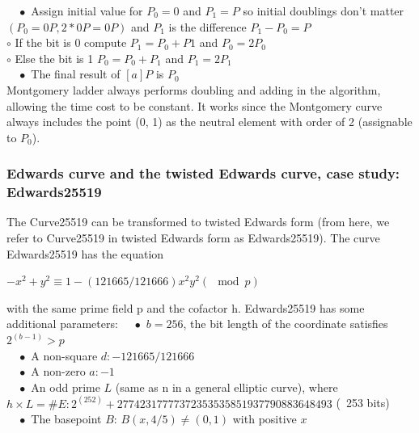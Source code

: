 $\quad\bullet$ Assign initial value for $P_0 = 0$ and $P_1 = P$ so initial doublings don’t matter $(P_0 =0P, 2*0P = 0P)$ and $P_1$ is the difference $P_1 - P_0 = P$\\
\vspace{0.5cm} $\circ$ If the bit is 0 compute $P_1 = P_0 +  P1$ and $P_0 = 2P_0$\\
\vspace{0.5cm} $\circ$ Else the bit is 1 $P_0 = P_0 +  P_1$ and $P_1 = 2P_1$\\

$\quad\bullet$ The final result of $[a]P$ is $P_0$\\

Montgomery ladder always performs doubling and adding in the algorithm, allowing the time cost to be constant. It works since the Montgomery curve always includes the point (0, 1) as the neutral element with order of 2 (assignable to $P_0$).\\


\subsubsection{Edwards curve and the twisted Edwards curve, case study: Edwards25519}
The Curve25519 can be transformed to twisted Edwards form (from here, we refer to Curve25519 in twisted Edwards form as Edwards25519). The curve Edwards25519 has the equation
\hspace{0.5cm}
\begin{center}
$- x^2 + y^2 \equiv 1 - (121665/121666)x^2 y^2(\mod p) $\\
\end{center}
\hspace{0.5cm}
with the same prime field p and the cofactor h. Edwards25519 has some additional parameters:
$\quad\bullet$ $b = 256$, the bit length of the coordinate satisfies $2^(b-1) > p$\\
$\quad\bullet$ A non-square $d: -121665/121666$\\
$\quad\bullet$ A non-zero $a: -1$\\
$\quad\bullet$ An odd prime $L$ (same as n in a general elliptic curve), where $h \times L = \#E: 2^(252)+27742317777372353535851937790883648493$ (~253 bits)\\
$\quad\bullet$ The basepoint $B$: $B(x, 4/5) \neq (0, 1)$ with positive $x$\\

